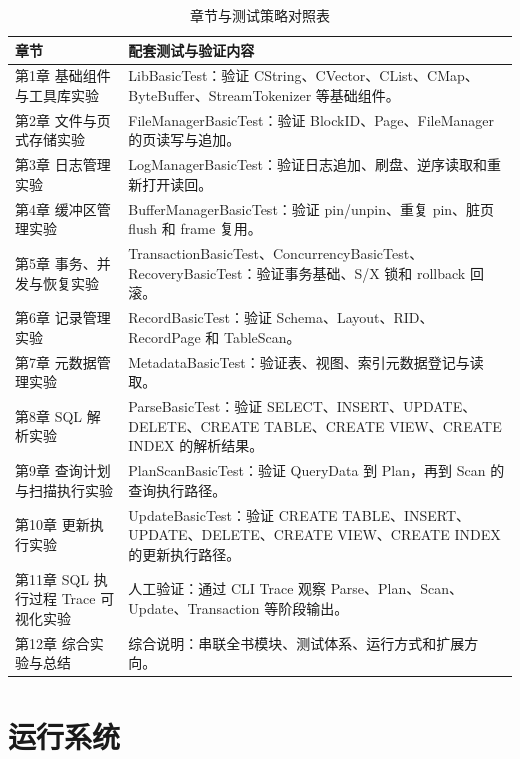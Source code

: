 \begin{table}[htbp]
  \centering
  \caption{章节与测试策略对照表}
  \label{tab:intro-chapter-test-strategy}
  \begin{tabularx}{\textwidth}{>{\raggedright\arraybackslash}p{} Y}
    \toprule
    章节 & 配套测试与验证内容 \\
    \midrule
    第1章 基础组件与工具库实验 & LibBasicTest：验证 CString、CVector、CList、CMap、ByteBuffer、StreamTokenizer 等基础组件。 \\
    第2章 文件与页式存储实验 & FileManagerBasicTest：验证 BlockID、Page、FileManager 的页读写与追加。 \\
    第3章 日志管理实验 & LogManagerBasicTest：验证日志追加、刷盘、逆序读取和重新打开读回。 \\
    第4章 缓冲区管理实验 & BufferManagerBasicTest：验证 pin/unpin、重复 pin、脏页 flush 和 frame 复用。 \\
    第5章 事务、并发与恢复实验 & TransactionBasicTest、ConcurrencyBasicTest、RecoveryBasicTest：验证事务基础、S/X 锁和 rollback 回滚。 \\
    第6章 记录管理实验 & RecordBasicTest：验证 Schema、Layout、RID、RecordPage 和 TableScan。 \\
    第7章 元数据管理实验 & MetadataBasicTest：验证表、视图、索引元数据登记与读取。 \\
    第8章 SQL 解析实验 & ParseBasicTest：验证 SELECT、INSERT、UPDATE、DELETE、CREATE TABLE、CREATE VIEW、CREATE INDEX 的解析结果。 \\
    第9章 查询计划与扫描执行实验 & PlanScanBasicTest：验证 QueryData 到 Plan，再到 Scan 的查询执行路径。 \\
    第10章 更新执行实验 & UpdateBasicTest：验证 CREATE TABLE、INSERT、UPDATE、DELETE、CREATE VIEW、CREATE INDEX 的更新执行路径。 \\
    第11章 SQL 执行过程 Trace 可视化实验 & 人工验证：通过 CLI Trace 观察 Parse、Plan、Scan、Update、Transaction 等阶段输出。 \\
    第12章 综合实验与总结 & 综合说明：串联全书模块、测试体系、运行方式和扩展方向。 \\
    \bottomrule
  \end{tabularx}
\end{table}

\section{运行系统}
\label{sec:intro-run-system}

